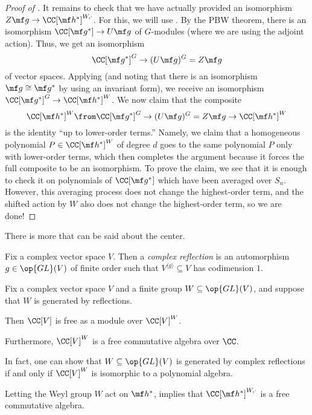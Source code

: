 \documentclass[../notes.tex]{subfiles}
\begin{document}
\begin{proof}[Proof of ]
	It remains to check that we have actually provided an isomorphism $Z\mf g\to\CC[\mf h^*]^{W,\cdot}$. For this, we will use . By the PBW theorem, there is an isomorphism $\CC[\mf g^*]\to U\mf g$ of $G$-modules (where we are using the adjoint action). Thus, we get an isomorphism
	\[\CC[\mf g^*]^G\to(U\mf g)^G=Z\mf g\]
	of vector spaces. Applying  (and noting that there is an isomorphism $\mf g\cong\mf g^*$ by using an invariant form), we receive an isomorphism $\CC[\mf g^*]^G\to\CC[\mf h^*]^W$. We now claim that the composite
	\[\CC[\mf h^*]^W\from\CC[\mf g^*]^G\to(U\mf g)^G=Z\mf g\to\CC[\mf h^*]^W\]
	is the identity ``up to lower-order terms.'' Namely, we claim that a homogeneous polynomial $P\in\CC[\mf h^*]^W$ of degree $d$ goes to the same polynomial $P$ only with lower-order terms, which then completes the argument because it forces the full composite to be an isomorphism. To prove the claim, we see that it is enough to check it on polynomials of $\CC[\mf g^*]$ which have been averaged over $S_n$. However, this averaging process does not change the highest-order term, and the shifted action by $W$ also does not change the highest-order term, so we are done!
\end{proof}
There is more that can be said about the center.
\begin{definition}
	Fix a complex vector space $V$. Then a \textit{complex reflection} is an automorphism $g\in\op{GL}(V)$ of finite order such that $V^{\langle g\rangle}\subseteq V$ has codimension $1$.
\end{definition}
\begin{theorem} \label{thm:easy-cst}
	Fix a complex vector space $V$ and a finite group $W\subseteq\op{GL}(V)$, and suppose that $W$ is generated by reflections.
	\begin{listalph}
		\item Then $\CC[V]$ is free as a module over $\CC[V]^W$.
		\item Furthermore, $\CC[V]^W$ is a free commutative algebra over $\CC$.
	\end{listalph}
\end{theorem}
\begin{remark}
	In fact, one can show that $W\subseteq\op{GL}(V)$ is generated by complex reflections if and only if $\CC[V]^W$ is isomorphic to a polynomial algebra.
\end{remark}
\begin{example}
	Letting the Weyl group $W$ act on $\mf h^*$,  implies that $\CC[\mf h^*]^{W,\cdot}$ is a free commutative algebra.
\end{example}
\end{document}
